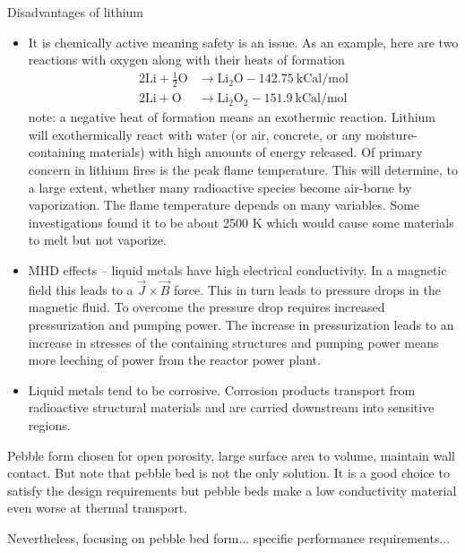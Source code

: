 \documentclass[11pt]{report} %
\begin{document}
Disadvantages of lithium
\begin{itemize}
\item {It is chemically active meaning safety is an issue. As an example, here are two reactions with oxygen along with their heats of formation
\begin{align*}
2\mathrm{Li} + \frac{1}{2}\mathrm{O} &\rightarrow \mathrm{Li}_2\mathrm{O} - 142.75~\text{kCal/mol}\\
2\mathrm{Li} + \mathrm{O} &\rightarrow \mathrm{Li}_2\mathrm{O}_2 - 151.9~\text{kCal/mol}
\end{align*}
note: a negative heat of formation means an exothermic reaction. Lithium will exothermically react with water (or air, concrete, or any moisture-containing materials) with high amounts of energy released. Of primary concern in lithium fires is the peak flame temperature. This will determine, to a large extent, whether many radioactive species become air-borne by vaporization. The flame temperature depends on many variables. Some investigations found it to be  about 2500 K which would cause some materials to melt but not vaporize.}
\item MHD effects -- liquid metals have high electrical conductivity. In a magnetic field this leads to a $\vec{J}\times\vec{B}$ force. This in turn leads to pressure drops in the magnetic fluid. To overcome the pressure drop requires increased pressurization and pumping power. The increase in pressurization leads to an increase in stresses of the containing structures and pumping power means more leeching of power from the reactor power plant.
\item Liquid metals tend to be corrosive. Corrosion products transport from radioactive structural materials and are carried downstream into sensitive regions.
\end{itemize}















Pebble form chosen for open porosity, large surface area to volume, maintain wall contact. But note that pebble bed is not the only solution. It is a good choice to satisfy the design requirements but pebble beds make a low conductivity material even worse at thermal transport.

Nevertheless, focusing on pebble bed form... specific performance requirements...
\end{document}
